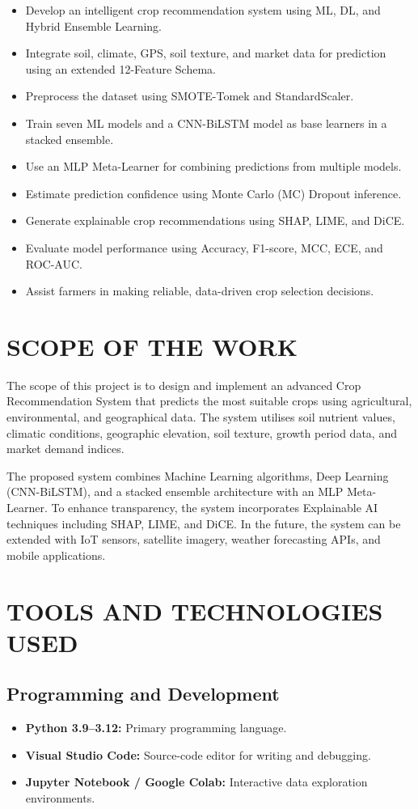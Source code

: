 \documentclass[12pt,a4paper,oneside]{report}
\begin{document}
\begin{itemize}[leftmargin=*, label=$\bullet$]
  \item Develop an intelligent crop recommendation system using ML, DL, and Hybrid Ensemble Learning.
  \item Integrate soil, climate, GPS, soil texture, and market data for prediction using an extended 12-Feature Schema.
  \item Preprocess the dataset using SMOTE-Tomek and StandardScaler.
  \item Train seven ML models and a CNN-BiLSTM model as base learners in a stacked ensemble.
  \item Use an MLP Meta-Learner for combining predictions from multiple models.
  \item Estimate prediction confidence using Monte Carlo (MC) Dropout inference.
  \item Generate explainable crop recommendations using SHAP, LIME, and DiCE.
  \item Evaluate model performance using Accuracy, F1-score, MCC, ECE, and ROC-AUC.
  \item Assist farmers in making reliable, data-driven crop selection decisions.
\end{itemize}

\section{SCOPE OF THE WORK}

The scope of this project is to design and implement an advanced Crop Recommendation System that predicts the most suitable crops using agricultural, environmental, and geographical data. The system utilises soil nutrient values, climatic conditions, geographic elevation, soil texture, growth period data, and market demand indices.

The proposed system combines Machine Learning algorithms, Deep Learning (CNN-BiLSTM), and a stacked ensemble architecture with an MLP Meta-Learner. To enhance transparency, the system incorporates Explainable AI techniques including SHAP, LIME, and DiCE. In the future, the system can be extended with IoT sensors, satellite imagery, weather forecasting APIs, and mobile applications.

\section{TOOLS AND TECHNOLOGIES USED}

\subsection{Programming and Development}
\begin{itemize}[leftmargin=*, label=$\bullet$]
  \item \textbf{Python 3.9--3.12:} Primary programming language.
  \item \textbf{Visual Studio Code:} Source-code editor for writing and debugging.
  \item \textbf{Jupyter Notebook / Google Colab:} Interactive data exploration environments.
\end{itemize}
\end{document}
